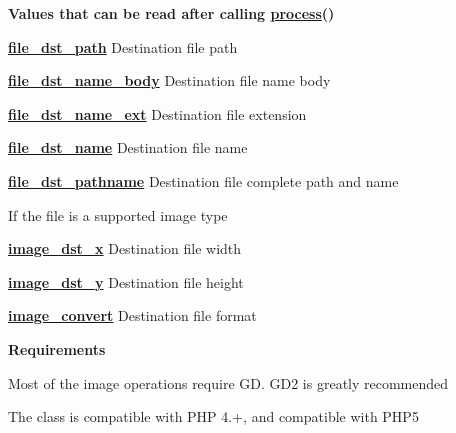 {\bfseries Values that can be read after calling \hyperlink{}{process}()} 
\begin{DoxyItemize}
\item {\bfseries \hyperlink{}{file\+\_\+dst\+\_\+path}} Destination file path 
\item {\bfseries \hyperlink{}{file\+\_\+dst\+\_\+name\+\_\+body}} Destination file name body 
\item {\bfseries \hyperlink{}{file\+\_\+dst\+\_\+name\+\_\+ext}} Destination file extension 
\item {\bfseries \hyperlink{}{file\+\_\+dst\+\_\+name}} Destination file name 
\item {\bfseries \hyperlink{}{file\+\_\+dst\+\_\+pathname}} Destination file complete path and name 
\end{DoxyItemize}If the file is a supported image type 
\begin{DoxyItemize}
\item {\bfseries \hyperlink{}{image\+\_\+dst\+\_\+x}} Destination file width 
\item {\bfseries \hyperlink{}{image\+\_\+dst\+\_\+y}} Destination file height 
\item {\bfseries \hyperlink{}{image\+\_\+convert}} Destination file format 
\end{DoxyItemize}

{\bfseries Requirements}

Most of the image operations require G\+D. G\+D2 is greatly recommended

The class is compatible with P\+H\+P 4.+, and compatible with P\+H\+P5

